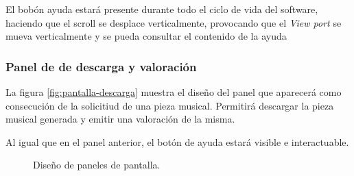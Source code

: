 El bobón ayuda estará presente durante todo el ciclo de vida del software, haciendo que el scroll se desplace verticalmente, provocando que el \emph{View port} se mueva verticalmente y se pueda consultar el contenido de la ayuda
 
\subsubsection{Panel de de descarga y valoración}

La figura \ref{fig:pantalla-descarga} muestra el diseño del panel que aparecerá como consecución de la solicitiud de una pieza musical. Permitirá descargar la pieza musical generada y emitir una valoración de la misma.


Al igual que en el panel anterior, el botón de ayuda estará visible e interactuable.

\begin{figure}[H]
    \begin{center}
      \caption{Diseño de paneles de pantalla.}
      \label{fig:diseno-panales}
    \end{center}
  \end{figure}